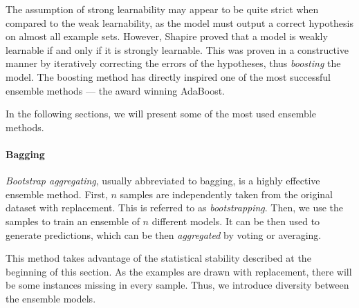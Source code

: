 

The assumption of strong learnability may appear to be quite strict when 
compared to the weak learnability, as the model must output a correct 
hypothesis on almost all example sets. However, Shapire proved that a model 
is weakly learnable if and only if it is strongly learnable. 
\citep{Schapire:1990:SWL:83637.83645} This was proven in a constructive manner
by iteratively correcting the errors of the hypotheses, thus \emph{boosting} 
the model. The boosting method has directly inspired one of the most successful
ensemble methods --- the award winning AdaBoost.
\cite{Freund:1996:ENB:3091696.3091715, Freund:1997:DGO:261540.261549}

In the following sections, we will present some of the most used ensemble 
methods.
\paragraph{Bagging} \label{bagging}
\emph{Bootstrap aggregating}, usually abbreviated to bagging, is a highly
effective ensemble method. First, $n$ samples are independently taken from 
the original dataset with replacement. This is referred to as 
\emph{bootstrapping}. Then, we use the samples to train an ensemble of $n$
different models. It can be then used to generate predictions, which can be
then \emph{aggregated} by voting or averaging.

This method takes advantage of the statistical stability described at the
beginning of this section. As the examples are drawn with replacement, there
will be some instances missing in every sample. Thus, we introduce diversity
between the ensemble models. \citep[331]{Flach:2012:MLA:2490546}

